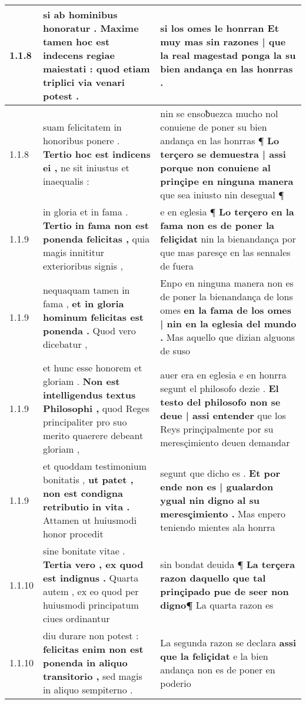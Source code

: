 \begin{tabular}{|p{1cm}|p{6.5cm}|p{6.5cm}|}
1.1.8 & si ab hominibus honoratur . \textbf{ Maxime tamen hoc est indecens regiae maiestati : } quod etiam triplici via venari potest . & si los omes le honrran \textbf{ Et muy mas sin razones | que la real magestad } ponga la su bien andança en las honrras . \\\hline
1.1.8 & suam felicitatem in honoribus ponere . \textbf{ Tertio hoc est indicens ei , } ne sit iniustus et inaequalis : & nin se ensoƀuezca mucho nol conuiene de poner su bien andança en las honrras ¶ \textbf{ Lo terçero se demuestra | assi porque non conuiene al prinçipe en ninguna manera } que sea iniusto nin desegual ¶ \\\hline
1.1.9 & in gloria et in fama . \textbf{ Tertio in fama non est ponenda felicitas , } quia magis innititur exterioribus signis , & e en eglesia ¶ \textbf{ Lo terçero en la fama non es de poner la feliçidat } nin la bienandança por que mas paresçe en las sennales de fuera \\\hline
1.1.9 & nequaquam tamen in fama , \textbf{ et in gloria hominum felicitas est ponenda . } Quod vero dicebatur , & Enpo en ninguna manera non es de poner la bienandança de lons omes \textbf{ en la fama de los omes | nin en la eglesia del mundo . } Mas aquello que dizian alguons de suso \\\hline
1.1.9 & et hunc esse honorem et gloriam . \textbf{ Non est intelligendus textus Philosophi , } quod Reges principaliter pro suo merito quaerere debeant gloriam , & auer era en eglesia e en honrra segunt el philosofo dezie . \textbf{ El testo del philosofo non se deue | assi entender } que los Reys prinçipalmente por su meresçimiento deuen demandar \\\hline
1.1.9 & et quoddam testimonium bonitatis , \textbf{ ut patet , non est condigna retributio in vita . } Attamen ut huiusmodi honor procedit & segunt que dicho es . \textbf{ Et por ende non es | gualardon ygual nin digno al su meresçimiento . } Mas enpero teniendo mientes ala honrra \\\hline
1.1.10 & sine bonitate vitae . \textbf{ Tertia vero , ex quod est indignus . } Quarta autem , ex eo quod per huiusmodi principatum ciues ordinantur & sin bondat deuida ¶ \textbf{ La terçera razon daquello que tal prinçipado pue de seer non digno¶ } La quarta razon es \\\hline
1.1.10 & diu durare non potest : \textbf{ felicitas enim non est ponenda in aliquo transitorio , } sed magis in aliquo sempiterno . & La segunda razon se declara \textbf{ assi que la feliçidat } e la bien andança non es de poner en poderio \\\hline

\end{tabular}
